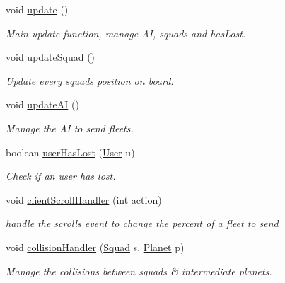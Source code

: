 \begin{DoxyCompactItemize}
\item 
void \hyperlink{classfr_1_1projet_1_1groupe40_1_1model_1_1board_1_1_galaxy_a26524a88f939563e1a433a5caebd5f31}{update} ()
\begin{DoxyCompactList}\small\item\em Main update function, manage AI, squads and has\+Lost. \end{DoxyCompactList}\item 
void \hyperlink{classfr_1_1projet_1_1groupe40_1_1model_1_1board_1_1_galaxy_a94ac22bfc0d4692c0cb68290dafefb62}{update\+Squad} ()
\begin{DoxyCompactList}\small\item\em Update every squads position on board. \end{DoxyCompactList}\item 
void \hyperlink{classfr_1_1projet_1_1groupe40_1_1model_1_1board_1_1_galaxy_a3845928fc6782971d4e687bf0371cae6}{update\+AI} ()
\begin{DoxyCompactList}\small\item\em Manage the AI to send fleets. \end{DoxyCompactList}\item 
boolean \hyperlink{classfr_1_1projet_1_1groupe40_1_1model_1_1board_1_1_galaxy_a95097e70a3cdd31b4ac52821851183e3}{user\+Has\+Lost} (\hyperlink{classfr_1_1projet_1_1groupe40_1_1client_1_1_user}{User} u)
\begin{DoxyCompactList}\small\item\em Check if an user has lost. \end{DoxyCompactList}\item 
void \hyperlink{classfr_1_1projet_1_1groupe40_1_1model_1_1board_1_1_galaxy_aa1dca5048cce816bb712466832a76264}{client\+Scroll\+Handler} (int action)
\begin{DoxyCompactList}\small\item\em handle the scrolls event to change the percent of a fleet to send \end{DoxyCompactList}\item 
void \hyperlink{classfr_1_1projet_1_1groupe40_1_1model_1_1board_1_1_galaxy_a2c14094cc08d7efa6fc63624bd479e5e}{collision\+Handler} (\hyperlink{classfr_1_1projet_1_1groupe40_1_1model_1_1ships_1_1_squad}{Squad} s, \hyperlink{classfr_1_1projet_1_1groupe40_1_1model_1_1board_1_1_planet}{Planet} p)
\begin{DoxyCompactList}\small\item\em Manage the collisions between squads \& intermediate planets. \end{DoxyCompactList}\item 

\end{DoxyCompactItemize}
